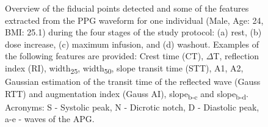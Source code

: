 \documentclass[fleqn,10pt]{wlscirep}
\begin{document}
\begin{figure}[ht]
\begin{subfigure}{.24\textwidth}
		\caption{}
	\end{subfigure}
	\caption{Overview of the fiducial points detected and some of the features extracted from the PPG waveform for one individual (Male, Age: 24, BMI: 25.1) during the four stages of the study protocol: (a) rest, (b) dose increase, (c) maximum infusion, and (d) washout. Examples of the following features are provided: Crest time (CT), $\Delta$T, reflection index (RI), width\textsubscript{25}, width\textsubscript{50}, slope transit time (STT), A1, A2, Gaussian estimation of the transit time of the reflected wave (Gauss RTT) and augmentation index (Gauss AI), slope\textsubscript{b-c} and slope\textsubscript{b-d}. Acronyms: S - Systolic peak, N - Dicrotic notch, D - Diastolic peak, a-e - waves of the APG.}
	\label{fig:PPG_features_overview}
\end{figure}
\end{document}
